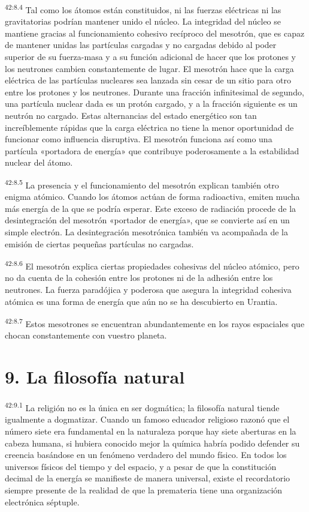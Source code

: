 \par
\textsuperscript{42:8.4} Tal como los átomos están constituidos, ni las fuerzas eléctricas ni las gravitatorias podrían mantener unido el núcleo. La integridad del núcleo se mantiene gracias al funcionamiento cohesivo recíproco del mesotrón, que es capaz de mantener unidas las partículas cargadas y no cargadas debido al poder superior de su fuerza-masa y a su función adicional de hacer que los protones y los neutrones cambien constantemente de lugar. El mesotrón hace que la carga eléctrica de las partículas nucleares sea lanzada sin cesar de un sitio para otro entre los protones y los neutrones. Durante una fracción infinitesimal de segundo, una partícula nuclear dada es un protón cargado, y a la fracción siguiente es un neutrón no cargado. Estas alternancias del estado energético son tan increíblemente rápidas que la carga eléctrica no tiene la menor oportunidad de funcionar como influencia disruptiva. El mesotrón funciona así como una partícula «portadora de energía» que contribuye poderosamente a la estabilidad nuclear del átomo.

\par
\textsuperscript{42:8.5} La presencia y el funcionamiento del mesotrón explican también otro enigma atómico. Cuando los átomos actúan de forma radioactiva, emiten mucha más energía de la que se podría esperar. Este exceso de radiación procede de la desintegración del mesotrón «portador de energía», que se convierte así en un simple electrón. La desintegración mesotrónica también va acompañada de la emisión de ciertas pequeñas partículas no cargadas.

\par
\textsuperscript{42:8.6} El mesotrón explica ciertas propiedades cohesivas del núcleo atómico, pero no da cuenta de la cohesión entre los protones ni de la adhesión entre los neutrones. La fuerza paradójica y poderosa que asegura la integridad cohesiva atómica es una forma de energía que aún no se ha descubierto en Urantia.

\par
\textsuperscript{42:8.7} Estos mesotrones se encuentran abundantemente en los rayos espaciales que chocan constantemente con vuestro planeta.

\section*{9. La filosofía natural}
\par
\textsuperscript{42:9.1} La religión no es la única en ser dogmática; la filosofía natural tiende igualmente a dogmatizar. Cuando un famoso educador religioso razonó que el número siete era fundamental en la naturaleza porque hay siete aberturas en la cabeza humana, si hubiera conocido mejor la química habría podido defender su creencia basándose en un fenómeno verdadero del mundo físico. En todos los universos físicos del tiempo y del espacio, y a pesar de que la constitución decimal de la energía se manifieste de manera universal, existe el recordatorio siempre presente de la realidad de que la premateria tiene una organización electrónica séptuple.

